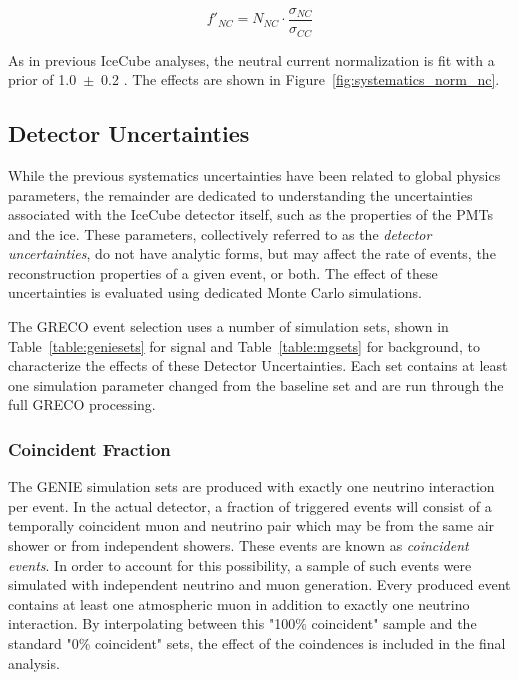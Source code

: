 \begin{equation}
f'_{NC} = N_{NC} \cdot \frac{\sigma_{NC}}{\sigma_{CC}}
\end{equation}

As in previous IceCube analyses, the neutral current normalization is fit with a prior of 1.0~$\pm$~0.2 \cite{IceCube-Oscillation2015,IceCube-Oscillation2018}.
The effects are shown in Figure~\ref{fig:systematics_norm_nc}.


\label{subsec:detector_systematics}
\subsection{Detector Uncertainties}
While the previous systematics uncertainties have been related to global physics parameters, the remainder are dedicated to understanding the uncertainties associated with the IceCube detector itself, such as the properties of the PMTs and the ice.
These parameters, collectively referred to as the \emph{detector uncertainties}, do not have analytic forms, but may affect the rate of events, the reconstruction properties of a given event, or both.
The effect of these uncertainties is evaluated using dedicated Monte Carlo simulations.

The GRECO event selection uses a number of simulation sets, shown in Table~\ref{table:geniesets} for signal and Table~\ref{table:mgsets} for background, to characterize the effects of these Detector Uncertainties.
Each set contains at least one simulation parameter changed from the baseline set and are run through the full GRECO processing.


\subsubsection{Coincident Fraction}
\label{subsubsec:coin_fraction}
The GENIE simulation sets are produced with exactly one neutrino interaction per event. 
In the actual detector, a fraction of triggered events will consist of a temporally coincident muon and neutrino pair which may be from the same air shower or from independent showers.
These events are known as \emph{coincident events}.
In order to account for this possibility, a sample of such events were simulated with independent neutrino and muon generation.
Every produced event contains at least one atmospheric muon in addition to exactly one neutrino interaction.
By interpolating between this "100\% coincident" sample and the standard "0\% coincident" sets, the effect of the coindences is included in the final analysis.

